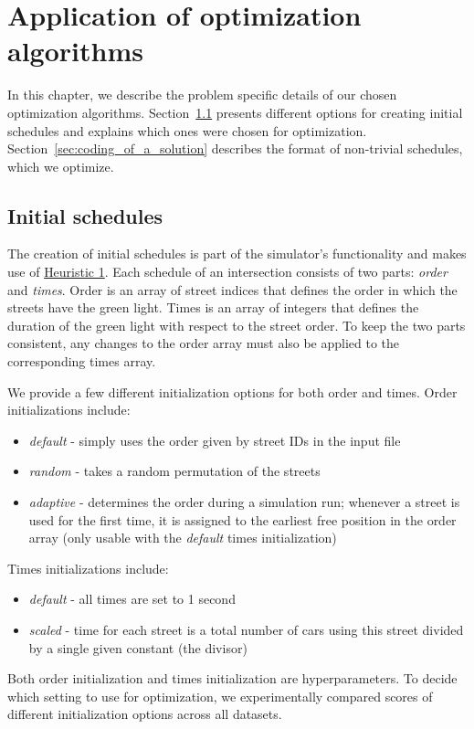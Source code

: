\chapter{Application of optimization algorithms}

In this chapter, we describe the problem specific details of our chosen optimization algorithms. Section~\ref{sec:initial_schedules} presents different options for creating initial schedules and explains which ones were chosen for optimization. Section~\ref{sec:coding_of_a_solution} describes the format of non-trivial schedules, which we optimize. 

\section{Initial schedules} \label{sec:initial_schedules}

The creation of initial schedules is part of the simulator's functionality and makes use of \hyperref[para:heuristic_1]{Heuristic 1}.
Each schedule of an intersection consists of two parts: \textit{order} and \textit{times}. Order is an array of street indices that defines the order in which the streets have the green light. Times is an array of integers that defines the duration of the green light with respect to the street order. To keep the two parts consistent, any changes to the order array must also be applied to the corresponding times array.

We provide a few different initialization options for both order and times. Order initializations include:
\begin{itemize}
    \item \textit{default} - simply uses the order given by street IDs in the input file
    \item \textit{random} - takes a random permutation of the streets
    \item \textit{adaptive} - determines the order during a simulation run; whenever a street is used for the first time, it is assigned to the earliest free position in the order array (only usable with the \textit{default} times initialization)
\end{itemize}
Times initializations include:
\begin{itemize}
    \item \textit{default} - all times are set to 1 second
    \item \textit{scaled} - time for each street is a total number of cars using this street divided by a single given constant (the divisor)
\end{itemize}
Both order initialization and times initialization are hyperparameters. To decide which setting to use for optimization, we experimentally compared scores of different initialization options across all datasets.


